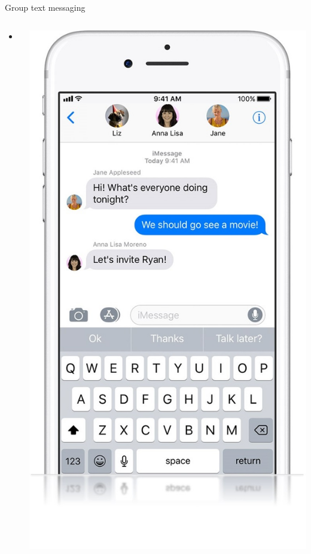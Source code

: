 \documentclass[screen, aspectratio=43,compress,dvipsnames]{beamer}
\begin{document}
\begin{frame}{Group text messaging}
\begin{columns}
\begin{column}{0.7\textwidth}
\begin{itemize}
				\item[]

				
			\end{itemize}
		\end{column}	
		\begin{column}{0.3\textwidth}
			\includegraphics[width=1\textwidth]{imessage_group_chat2}
		\end{column}

	\end{columns}
	
\end{frame}
\end{document}
